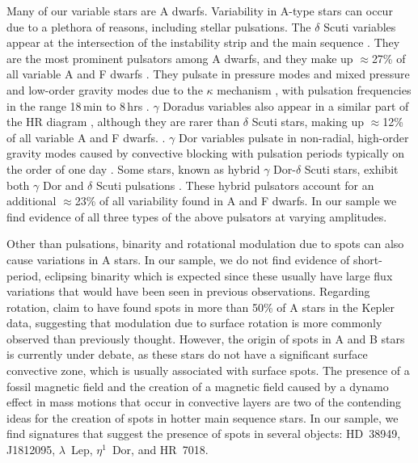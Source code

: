 \documentclass[twocolumn, linenumbers]{aastex631}
\begin{document}
Many of our variable stars are A dwarfs.  Variability in A-type stars can occur due to a plethora of reasons, including stellar pulsations.  The $\delta$ Scuti variables appear at the intersection of the instability strip and the main sequence \citep[e.g.,][]{Petit1987}.  They are the most prominent pulsators among A dwarfs, and they make up $\approx$27\% of all variable A and F dwarfs \citep{Uytterhoeven2011}. They pulsate in pressure modes and mixed pressure and low-order gravity modes due to the $\kappa$ mechanism \citep{Lee1985}, with pulsation frequencies in the range 18\,min to 8\,hrs \citep{Amado2004}. $\gamma$ Doradus variables also appear in a similar part of the HR diagram \citep[e.g.,][]{Kaye1999}, although they are rarer than $\delta$ Scuti stars, making up $\approx$12\% of all variable A and F dwarfs. \citep{Uytterhoeven2011}. $\gamma$ Dor variables pulsate in non-radial, high-order gravity modes caused by convective blocking \citep{Guzik2000} with pulsation periods typically on the order of one day \citep{Grigahcene2010}.  Some stars, known as hybrid $\gamma$ Dor-$\delta$ Scuti stars, exhibit both $\gamma$ Dor and $\delta$ Scuti pulsations \citep{Grigahcene2010}.  These hybrid pulsators account for an additional $\approx$23\% of all variability found in A and F dwarfs. In our sample we find evidence of all three types of the above pulsators at varying amplitudes.

Other than pulsations, binarity and rotational modulation due to spots can also cause variations in A stars. In our sample, we do not find evidence of short-period, eclipsing binarity which is expected since these usually have large flux variations that would have been seen in previous observations. Regarding rotation, \citet{Balona2013, Balona2017} claim to have found spots in more than 50\% of A stars in the Kepler data, suggesting that modulation due to surface rotation is more commonly observed than previously thought. However, the origin of spots in A and B stars is currently under debate, as these stars do not have a significant surface convective zone, which is usually associated with surface spots. The presence of a fossil magnetic field \citep{Parker1955} and the creation of a magnetic field caused by a dynamo effect in mass motions that occur in convective layers \citep{Charbonneau2014} are two of the contending ideas for the creation of spots in hotter main sequence stars. In our sample, we find signatures that suggest the presence of spots in several objects:  HD~38949, J1812095, $\lambda$~Lep, $\eta^1$~Dor, and HR~7018.
\end{document}
